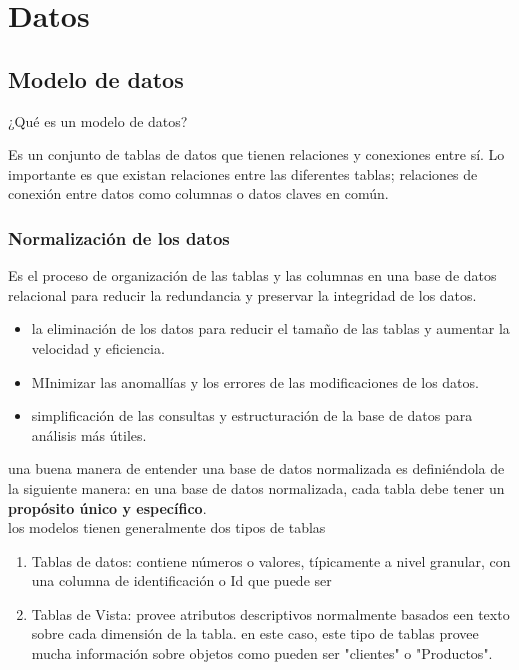 \chapter{Datos}


\section{Modelo de datos}


¿Qué es un modelo de datos?

Es un conjunto de tablas de datos que tienen relaciones y conexiones entre sí. Lo importante es que existan relaciones entre las diferentes tablas; relaciones de conexión entre datos como columnas o datos claves en común.

\subsection{Normalización de los datos}

Es el proceso de organización de las tablas y las columnas en una base de datos relacional para reducir la redundancia y preservar la integridad de los datos.

\begin{itemize}
    \item la eliminación de los datos para reducir el tamaño de las tablas y aumentar la velocidad y eficiencia.
    \item MInimizar las anomallías y los errores de las modificaciones de los datos.
    \item simplificación de las consultas y estructuración de la base de datos para análisis más útiles.
\end{itemize}

una buena manera de entender una base de datos normalizada es definiéndola de la siguiente manera: en una base de datos normalizada, cada tabla debe tener un \textbf{propósito único y específico}. \\

los modelos tienen generalmente dos tipos de tablas

\begin{enumerate}
    \item Tablas de datos: contiene números o valores, típicamente a nivel granular, con una columna de identificación o Id que puede ser
    \item Tablas de Vista: provee atributos descriptivos normalmente basados een texto sobre cada dimensión de la tabla. en este caso, este tipo de tablas provee mucha información sobre objetos como pueden ser "clientes" o "Productos".
\end{enumerate}

